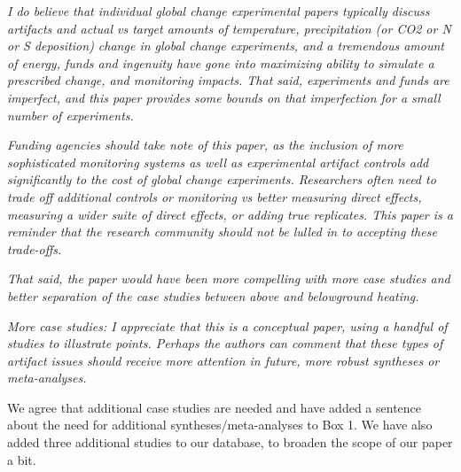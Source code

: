 \documentclass[11pt,a4paper]{letter}
\begin{document}
\par \emph{I do believe that individual global change experimental papers typically discuss artifacts and actual vs target amounts of temperature, precipitation (or CO2 or N or S deposition) change in global change experiments, and a  tremendous amount of energy, funds and ingenuity have gone into maximizing ability to simulate a prescribed change, and monitoring impacts.  That said, experiments and funds are imperfect, and this paper provides some bounds on that imperfection for a small number of experiments.}

\par \emph{Funding agencies should take note of this paper, as the inclusion of more sophisticated monitoring systems as well as experimental artifact controls add significantly to the cost of global change experiments.  Researchers often need to trade off additional controls or monitoring vs better measuring direct effects, measuring a wider suite of direct effects, or adding true replicates.  This paper is a reminder that the research community should not be lulled in to accepting these trade-offs.}

\par \emph{That said, the paper would have been more compelling with more case studies and better separation of the case studies between above and belowground heating.}

\par \emph{More case studies:  I appreciate that this is a conceptual paper, using a handful of studies to illustrate points.  Perhaps the authors can comment that these types of artifact issues should receive more attention in future, more robust syntheses or meta-analyses.}
\par We agree that additional case studies are needed and have added a sentence about the need for additional syntheses/meta-analyses to Box 1. We have also added three additional studies to our database, to broaden the scope of our paper a bit.  
\end{document}
